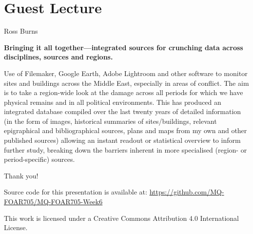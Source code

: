 \documentclass[aspectratio=1610, 11pt]{beamer} %
\begin{document}
\section{Guest Lecture}
\begin{frame}{Ross Burns}

{\bf Bringing it all together—integrated sources for crunching data across disciplines, sources and regions.}

Use of Filemaker, Google Earth, Adobe Lightroom and other software to monitor sites and buildings across the Middle East, especially in areas of conflict. The aim is to take a region-wide look at the damage across all periods for which we have physical remains and in all political environments. This has produced an integrated database compiled over the last twenty years of detailed information (in the form of images, historical summaries of sites/buildings, relevant epigraphical and bibliographical sources, plans and maps from my own and other published sources) allowing an instant readout or statistical overview to inform further study, breaking down the barriers inherent in more specialised (region- or period-specific) sources.
    
\end{frame}


% 
% 


  
%   
%   


\begin{frame}{Thank you!}


Source code for this presentation is available at: \url{https://github.com/MQ-FOAR705/MQ-FOAR705-Week6}

This work is licensed under a Creative Commons Attribution 4.0 International License.

\end{frame}
\end{document}
